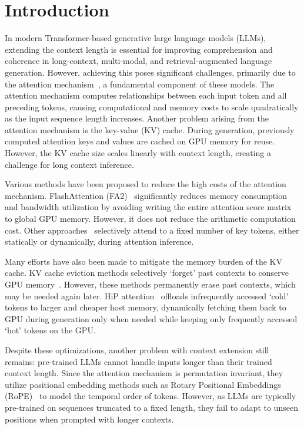 \section{Introduction}
\label{introduction}




In modern Transformer-based generative large language models (LLMs), extending the context length is essential for improving comprehension and coherence in long-context, multi-modal, and retrieval-augmented language generation. However, achieving this poses significant challenges, primarily due to the attention mechanism~\citep{vaswani_attention_2023}, a fundamental component of these models. The attention mechanism computes relationships between each input token and all preceding tokens, causing computational and memory costs to scale quadratically as the input sequence length increases. Another problem arising from the attention mechanism is the key-value (KV) cache. During generation, previously computed attention keys and values are cached on GPU memory for reuse. However, the KV cache size scales linearly with context length, creating a challenge for long context inference.

Various methods have been proposed to reduce the high costs of the attention mechanism. 
FlashAttention (FA2)~\citep{dao_flashattention_2022} significantly reduces memory consumption and bandwidth utilization by avoiding writing the entire attention score matrix to global GPU memory. However, it does not reduce the arithmetic computation cost. Other approaches~\citep{xiao_efficient_2024, lee_training-free_2024} selectively attend to a fixed number of key tokens, either statically or dynamically, during attention inference.

Many efforts have also been made to mitigate the memory burden of the KV cache. KV cache eviction methods selectively `forget' past contexts to conserve GPU memory~\citep{zhang_h_2o_2023, oren_transformers_2024}. However, these methods permanently erase past contexts, which may be needed again later. HiP attention~\citep{lee_training-free_2024} offloads infrequently accessed `cold' tokens to larger and cheaper host memory, dynamically fetching them back to GPU during generation only when needed while keeping only frequently accessed `hot' tokens on the GPU.

Despite these optimizations, another problem with context extension still remains: pre-trained LLMs cannot handle inputs longer than their trained context length. Since the attention mechanism is permutation invariant, they utilize positional embedding methods such as Rotary Positional Embeddings (RoPE)~\cite{su_roformer_2023} to model the temporal order of tokens. However, as LLMs are typically pre-trained on sequences truncated to a fixed length, they fail to adapt to unseen positions when prompted with longer contexts.

